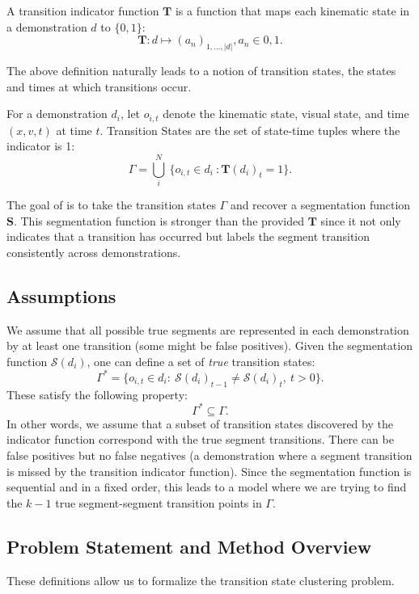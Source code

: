 \begin{definition}
A transition indicator function $\mathbf{T}$ is a function that maps each kinematic state in a demonstration $d$ to $\{0,1\}$:
\[
\mathbf{T}: d \mapsto (a_n)_{1,...,|d|}, a_n \in {0,1}.
\]
\end{definition}

The above definition naturally leads to a notion of transition states, the states and times at which transitions occur.

\begin{definition}
For a demonstration $d_i$, let $o_{i,t}$ denote the kinematic state, visual state, and time $(x,v,t)$ at time $t$.
Transition States are the set of state-time tuples where the indicator is 1:
\[
\Gamma = \bigcup_{i}^N ~\{o_{i,t} \in d_i ~: \mathbf{T}(d_i)_t = 1\}.
\]
\end{definition}

The goal of \tsc is to take the transition states $\Gamma$ and recover a segmentation function $\mathbf{S}$. This segmentation function is stronger than the provided $\mathbf{T}$ since it not only indicates that a transition has occurred but labels the segment transition consistently across demonstrations.

\subsection*{Assumptions}
We assume that all possible true segments are represented in each demonstration by at least one transition (some might be false positives).
Given the segmentation function $\mathcal{S}(d_i)$, one can define a set of \emph{true} transition states:
\[\Gamma^* = \{
o_{i,t} \in d_i : ~\mathcal{S}(d_i)_{t-1} \ne \mathcal{S}(d_i)_t,~ t > 0\}.
\]
These satisfy the following property:
\[
 \Gamma^* \subseteq \Gamma.
\]
In other words, we assume that a subset of transition states discovered by the indicator function correspond with the true segment transitions.
There can be false positives but no false negatives (a demonstration where a segment transition is missed by the transition indicator function).
Since the segmentation function is sequential and in a fixed order, this leads to a model where we are trying to find the $k-1$ true segment-segment transition points in $\Gamma$.

\subsection*{Problem Statement and Method Overview}\label{ps}
These definitions allow us to formalize the transition state clustering problem. 

